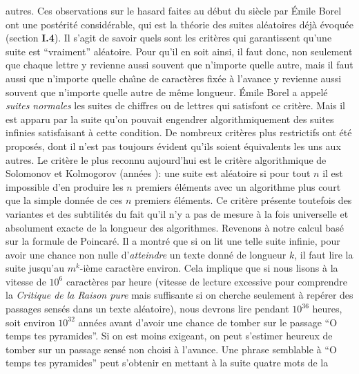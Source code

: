 autres. 
\medskip
Ces observations sur le hasard faites au d\'ebut du si\`ecle par \'Emile 
Borel
ont une post\'erit\'e consid\'erable, qui est la th\'eorie des suites al\'eatoires d\'ej\`a \'evoqu\'ee (section {\bf I.4}). Il s'agit de savoir 
quels sont les crit\`eres qui garantissent qu'une suite est ``vraiment''
al\'eatoire. Pour qu'il en soit ainsi, il faut donc, non seulement que 
chaque lettre y revienne aussi souvent que n'importe quelle autre, 
mais il faut aussi que n'importe quelle cha{\^\i}ne de caract\`eres fix\'ee
\`a l'avance y revienne aussi souvent que n'importe quelle autre de m\^eme 
longueur. \'Emile Borel a appel\'e 
{\it suites normales} les suites de chiffres ou de lettres qui satisfont 
ce crit\`ere.  Mais il est apparu par la suite qu'on pouvait engendrer
algorithmiquement des suites infinies satisfaisant \`a cette condition. 
De nombreux crit\`eres plus restrictifs ont \'et\'e propos\'es, dont 
il n'est pas toujours \'evident qu'ils soient \'equivalents les uns 
aux autres. Le crit\`ere le plus reconnu aujourd'hui est le crit\`ere
algorithmique de Solomonov et Kolmogorov (ann\'ees {}): 
une suite est al\'eatoire si pour tout $n$ il est impossible d'en 
produire les $n$ premiers \'el\'ements avec un algorithme plus court 
que la simple donn\'ee de ces $n$ premiers \'el\'ements. Ce crit\`ere
pr\'esente toutefois des variantes et des subtilit\'es du fait qu'il 
n'y a pas de mesure \`a la fois universelle et absolument exacte de 
la longueur des algorithmes.
\medskip
Revenons \`a notre calcul bas\'e sur la formule de Poincar\'e. Il a montr\'e 
que si on lit une telle suite infinie, pour avoir une chance non nulle 
d'{\it atteindre} un texte donn\'e de longueur $k$, il faut lire la suite
jusqu'au $m^k$-i\`eme caract\`ere environ.
\medskip
Cela implique que si nous lisons \`a la vitesse de $10^6$ caract\`eres 
par heure (vitesse de lecture excessive pour comprendre la {\it Critique
de la Raison pure} mais suffisante si on cherche seulement \`a rep\'erer
des passages sens\'es dans un texte al\'eatoire),  nous devrons lire 
pendant $10^{36}$ heures,  soit environ $10^{32}$ ann\'ees avant d'avoir
une chance de tomber sur le passage ``O temps tes pyramides''.  Si on est
moins exigeant,  on peut s'estimer heureux de tomber sur un passage
sens\'e non choisi \`a l'avance.  Une phrase semblable \`a ``O temps tes
pyramides'' peut s'obtenir en mettant \`a la suite quatre mots de la
